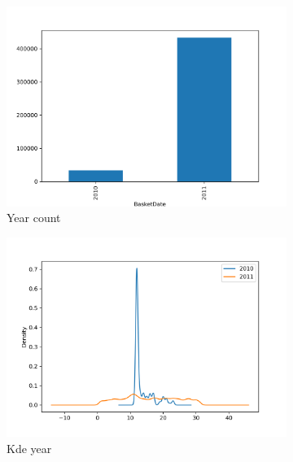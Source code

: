 \begin{figure}
\begin{subfigure}{.5\textwidth}
\centering
\includegraphics[width=1\textwidth]{img/year_count.png}
\caption{Year count}
\label{fig:year_count}
\end{subfigure}
\begin{subfigure}{.5\textwidth}
\centering
\includegraphics[width=1\textwidth]{img/kde_year.png}
\caption{Kde year}
\label{fig:kde_year}
\end{subfigure}
\caption{}
\end{figure}

